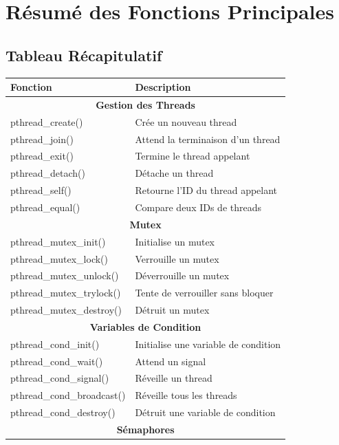 \documentclass[11pt,a4paper]{article}
\begin{document}
\section{Résumé des Fonctions Principales}

\subsection{Tableau Récapitulatif}

\begin{center}
\small
\begin{tabular}{|l|p{9cm}|}
\hline
\textbf{Fonction} & \textbf{Description} \\
\hline
\multicolumn{2}{|c|}{\textbf{Gestion des Threads}} \\
\hline
pthread\_create() & Crée un nouveau thread \\
pthread\_join() & Attend la terminaison d'un thread \\
pthread\_exit() & Termine le thread appelant \\
pthread\_detach() & Détache un thread \\
pthread\_self() & Retourne l'ID du thread appelant \\
pthread\_equal() & Compare deux IDs de threads \\
\hline
\multicolumn{2}{|c|}{\textbf{Mutex}} \\
\hline
pthread\_mutex\_init() & Initialise un mutex \\
pthread\_mutex\_lock() & Verrouille un mutex \\
pthread\_mutex\_unlock() & Déverrouille un mutex \\
pthread\_mutex\_trylock() & Tente de verrouiller sans bloquer \\
pthread\_mutex\_destroy() & Détruit un mutex \\
\hline
\multicolumn{2}{|c|}{\textbf{Variables de Condition}} \\
\hline
pthread\_cond\_init() & Initialise une variable de condition \\
pthread\_cond\_wait() & Attend un signal \\
pthread\_cond\_signal() & Réveille un thread \\
pthread\_cond\_broadcast() & Réveille tous les threads \\
pthread\_cond\_destroy() & Détruit une variable de condition \\
\hline
\multicolumn{2}{|c|}{\textbf{Sémaphores}} \\

\end{tabular}
\end{center}
\end{document}
